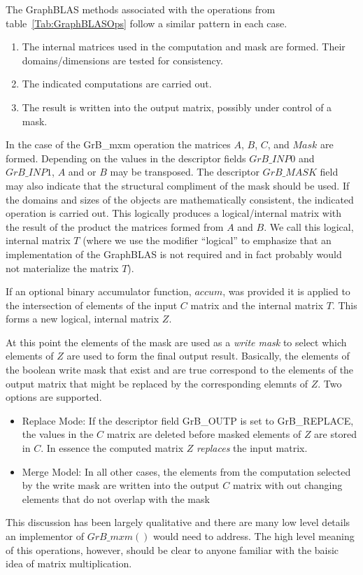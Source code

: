 The GraphBLAS methods associated with the operations from table~\ref{Tab:GraphBLASOps} follow a similar pattern
in each case.
\begin{enumerate}
\item The internal matrices used in the computation and mask are formed.  Their domains/dimensions are tested for consistency.
\item The indicated computations are carried out.
\item The result is written into the output matrix, possibly under control of a mask.
\end{enumerate}
In the case of the {\sf GrB\_mxm} operation the matrices $A$, $B$, $C$, and $Mask$ are formed.  Depending on
the values in the descriptor fields $GrB\_INP0$ and $GrB\_INP1$,  $A$ and or $B$ may be transposed.
The descriptor $GrB\_MASK$ field may also indicate that the structural compliment of the mask 
should be used.  If the domains and sizes of the objects are mathematically consistent, the indicated operation is carried out.
This logically produces a logical/internal matrix with the result of the product the matrices formed from $A$ and $B$.
We call this logical, internal matrix $T$ (where we use the modifier ``logical'' to emphasize that an implementation
of the GraphBLAS is not required and in fact probably would not materialize the matrix $T$).

If an optional binary accumulator function, $accum$, was provided it is applied to the intersection of elements of 
the input $C$ matrix and the internal matrix $T$.  This forms a new logical, internal matrix $Z$. 

At this point the elements of the mask are used as a \emph{write mask} to select which elements of $Z$ are 
used to form the final output result.  Basically, the elements of the boolean write mask that exist and are true 
correspond to the elements of the output matrix that might be replaced by the corresponding elemnts of $Z$.
Two options are supported. 
\begin{itemize}
\item Replace Mode: If the descriptor field {\sf GrB\_OUTP} is set to {\sf GrB\_REPLACE}, the 
values in the $C$ matrix are deleted before masked elements of $Z$ are stored 
in $C$.  In essence the computed matrix $Z$ \emph{replaces} the input matrix.
\item Merge Model: In all other cases, the elements from the computation selected by the 
write mask are written into the output $C$ matrix with out changing elements
that do not overlap with the mask
\end{itemize}
This discussion has been largely qualitative and there are many low level details an implementor
of $GrB\_mxm()$ would need to address.  The high level meaning of this operations, however, should
be clear to anyone familiar with the baisic idea of matrix multiplication.

